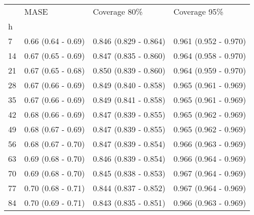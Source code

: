 \begin{tabular}{llll}
\toprule
{} &                MASE &           Coverage 80\% &           Coverage 95\% \\
h  &                     &                        &                        \\
\midrule
7  &  0.66 (0.64 - 0.69) &  0.846 (0.829 - 0.864) &  0.961 (0.952 - 0.970) \\
14 &  0.67 (0.65 - 0.69) &  0.847 (0.835 - 0.860) &  0.964 (0.958 - 0.970) \\
21 &  0.67 (0.65 - 0.68) &  0.850 (0.839 - 0.860) &  0.964 (0.959 - 0.970) \\
28 &  0.67 (0.66 - 0.69) &  0.849 (0.840 - 0.858) &  0.965 (0.961 - 0.969) \\
35 &  0.67 (0.66 - 0.69) &  0.849 (0.841 - 0.858) &  0.965 (0.961 - 0.969) \\
42 &  0.68 (0.66 - 0.69) &  0.847 (0.839 - 0.855) &  0.965 (0.962 - 0.969) \\
49 &  0.68 (0.67 - 0.69) &  0.847 (0.839 - 0.855) &  0.965 (0.962 - 0.969) \\
56 &  0.68 (0.67 - 0.70) &  0.847 (0.839 - 0.854) &  0.966 (0.963 - 0.969) \\
63 &  0.69 (0.68 - 0.70) &  0.846 (0.839 - 0.854) &  0.966 (0.964 - 0.969) \\
70 &  0.69 (0.68 - 0.70) &  0.845 (0.838 - 0.853) &  0.967 (0.964 - 0.969) \\
77 &  0.70 (0.68 - 0.71) &  0.844 (0.837 - 0.852) &  0.967 (0.964 - 0.969) \\
84 &  0.70 (0.69 - 0.71) &  0.843 (0.835 - 0.851) &  0.966 (0.963 - 0.969) \\
\bottomrule
\end{tabular}
